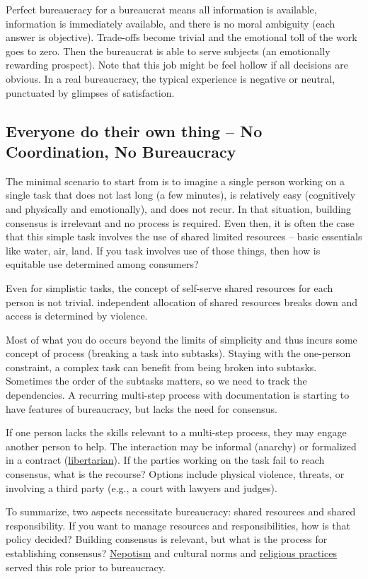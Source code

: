 Perfect bureaucracy for a bureaucrat means all information is available, information is immediately available, and there is no moral ambiguity (each answer is objective). Trade-offs become trivial and the emotional toll of the work goes to zero. Then the bureaucrat is able to serve subjects (an emotionally rewarding prospect). Note that this job might be feel hollow if all decisions are obvious. In a real bureaucracy, the typical experience is negative or neutral, punctuated by glimpses of satisfaction. 

\subsection{Everyone do their own thing -- No Coordination, No Bureaucracy}
The minimal scenario to start from is to imagine a single person working on a single task that does not last long (a few minutes), is relatively easy (cognitively and physically and emotionally), and does not recur. In that situation, building consensus is irrelevant and no process is required. Even then, it is often the case that this simple task involves the use of shared limited resources -- basic essentials like water, air, land. If you task involves use of those things, then how is equitable use determined among consumers?

Even for simplistic tasks, the concept of self-serve shared resources for each person is not trivial. independent allocation of shared resources breaks down and access is determined by violence.

Most of what you do occurs beyond the limits of simplicity and thus incurs some concept of \gls{process} (breaking a task into subtasks). Staying with the one-person constraint, a complex task can benefit from being broken into subtasks. Sometimes the order of the subtasks matters, so we need to track the dependencies. A recurring multi-step process with documentation is starting to have features of bureaucracy, but lacks the need for consensus. 


If one person lacks the skills relevant to a multi-step process, they may engage another person to help. The interaction may be informal (anarchy) or formalized in a contract (\href{https://en.wikipedia.org/wiki/Libertarianism}{libertarian}). If the parties working on the task fail to reach consensus, what is the recourse? Options include physical violence, threats, or involving a third party (e.g., a court with lawyers and judges). 


To summarize, two aspects necessitate bureaucracy: shared resources and shared responsibility. 
If you want to manage resources and responsibilities, how is that policy decided?  Building consensus is relevant, but what is the process for establishing consensus? \href{https://en.wikipedia.org/wiki/Nepotism}{Nepotism} and cultural norms and \href{https://en.wikipedia.org/wiki/Religion}{religious practices} served this role prior to bureaucracy. 


